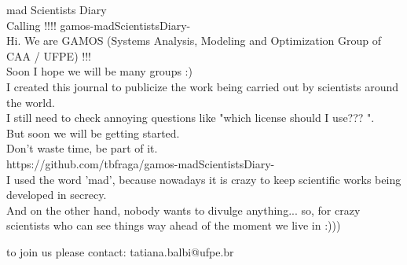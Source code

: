 \documentclass{book}
\begin{document}
\huge{mad Scientists Diary} \\

\large{Calling !!!! gamos-madScientistsDiary-} \\

Hi. We are GAMOS (Systems Analysis, Modeling and Optimization Group of CAA / UFPE) !!! \\

Soon I hope we will be many groups :) \\

I created this journal to publicize the work being carried out by scientists around the world. \\

I still need to check annoying questions like "which license should I use??? ". \\

But soon we will be getting started. \\

Don't waste time, be part of it. \\

https://github.com/tbfraga/gamos-madScientistsDiary- \\

I used the word 'mad', because nowadays it is crazy to keep scientific works being developed in secrecy. \\

And on the other hand, nobody wants to divulge anything... so, for crazy scientists who can see things way ahead of the moment we live in :)))

to join us please contact: tatiana.balbi@ufpe.br 
\end{document}
